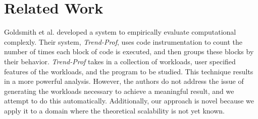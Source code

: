 \section{Related Work}

  Goldsmith et al. \cite{Goldsmith:2007:MEC:1287624.1287681} 
  developed a system to empirically evaluate computational
  complexly.  Their system, \textit{Trend-Prof}, uses code
  instrumentation to count the number of times each block 
  of code is executed, and then
  groups these blocks by their behavior.  \textit{Trend-Prof} takes in a
  collection of workloads, user specified features of the workloads, and
  the program to be studied. This technique results in a more powerful
  analysis. However, the authors do not address the
  issue of generating the workloads necessary to achieve a meaningful
  result, and we attempt to do this automatically.  Additionally, our
  approach is novel because we apply it to a domain where the
  theoretical scalability is not yet known.
